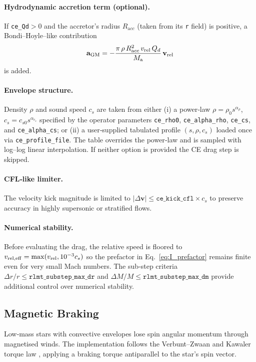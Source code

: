 \documentclass[11pt]{article}
\begin{document}
\paragraph{Hydrodynamic accretion term (optional).}
If \texttt{ce\_Qd}$>$0 and the accretor's radius $R_{\mathrm acc}$ (taken from its
\texttt{r} field) is positive, a Bondi–Hoyle–like contribution
\[
\mathbf a_{\rm GM}
=-\frac{\pi\,\rho\,R_{\mathrm acc}^2\,v_{\rm rel}\,Q_d}{M_{\mathrm a}}
\,\mathbf v_{\rm rel}
\]
is added.

\paragraph{Envelope structure.}
Density $\rho$ and sound speed $c_s$ are taken from either
(i) a power‑law $\rho=\rho_0s^{\alpha_\rho}$, $c_s=c_{s0}s^{\alpha_{c_s}}$
specified by the operator parameters \texttt{ce\_rho0}, \texttt{ce\_alpha\_rho},
\texttt{ce\_cs}, and \texttt{ce\_alpha\_cs}; or
(ii) a user‑supplied tabulated profile $(s,\rho,c_s)$ loaded once via
\texttt{ce\_profile\_file}.  The table overrides the power‑law and is sampled
with log–log linear interpolation.  If neither option is provided the CE drag
step is skipped.

\paragraph{CFL‑like limiter.}
The velocity kick magnitude is limited to
$|\Delta\mathbf v|\le\texttt{ce\_kick\_cfl}\times c_s$ to preserve accuracy
in highly supersonic or stratified flows.

\paragraph{Numerical stability.}
Before evaluating the drag, the relative speed is floored to
$v_{\rm rel,eff}=\max(v_{\rm rel},10^{-3}c_s)$ so the prefactor in
Eq.~\eqref{eq:I_prefactor} remains finite even for very small Mach numbers.
The sub‑step criteria $\Delta r/r\le\texttt{rlmt\_substep\_max\_dr}$ and
$\Delta M/M\le\texttt{rlmt\_substep\_max\_dm}$ provide additional control over
numerical stability.

\subsection{Magnetic Braking}
\label{sec:mb}

Low‑mass stars with convective envelopes lose spin angular momentum through
magnetised winds.  The implementation follows the Verbunt–Zwaan and Kawaler
torque law \citep{Verbunt1981,Kawaler1988}, applying a braking torque
antiparallel to the star's spin vector.
\end{document}
